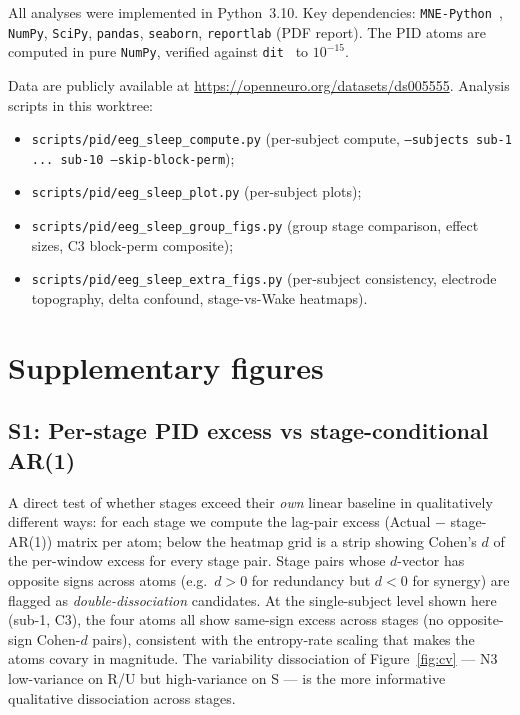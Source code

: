\documentclass[11pt,a4paper]{article}
\begin{document}
All analyses were implemented in Python~3.10.
Key dependencies: \texttt{MNE-Python}~\citep{gramfort2013meg},
\texttt{NumPy}, \texttt{SciPy}, \texttt{pandas}, \texttt{seaborn},
\texttt{reportlab} (PDF report).  The PID atoms are computed in pure
\texttt{NumPy}, verified against \texttt{dit}~\citep{james2018dit} to
$10^{-15}$.

Data are publicly available at \url{https://openneuro.org/datasets/ds005555}.
Analysis scripts in this worktree:
\begin{itemize}
  \item \texttt{scripts/pid/eeg\_sleep\_compute.py} (per-subject compute,
    \texttt{--subjects sub-1 ... sub-10 --skip-block-perm});
  \item \texttt{scripts/pid/eeg\_sleep\_plot.py} (per-subject plots);
  \item \texttt{scripts/pid/eeg\_sleep\_group\_figs.py} (group stage
    comparison, effect sizes, C3 block-perm composite);
  \item \texttt{scripts/pid/eeg\_sleep\_extra\_figs.py} (per-subject
    consistency, electrode topography, delta confound, stage-vs-Wake
    heatmaps).
\end{itemize}

\section*{Supplementary figures}

\subsection*{S1: Per-stage PID excess vs stage-conditional AR(1)}
\label{sec:supp:per_stage_excess}

A direct test of whether stages exceed their \emph{own} linear baseline in
qualitatively different ways: for each stage we compute the lag-pair
excess (Actual $-$ stage-AR(1)) matrix per atom; below the heatmap grid is
a strip showing Cohen's $d$ of the per-window excess for every stage
pair.  Stage pairs whose $d$-vector has opposite signs across atoms (e.g.\
$d > 0$ for redundancy but $d < 0$ for synergy) are flagged as
\emph{double-dissociation} candidates.  At the single-subject level shown
here (sub-1, C3), the four atoms all show same-sign excess across stages
(no opposite-sign Cohen-$d$ pairs), consistent with the entropy-rate
scaling that makes the atoms covary in magnitude.  The variability
dissociation of Figure~\ref{fig:cv} --- N3 low-variance on R/U but
high-variance on S --- is the more informative qualitative dissociation
across stages.
\end{document}
